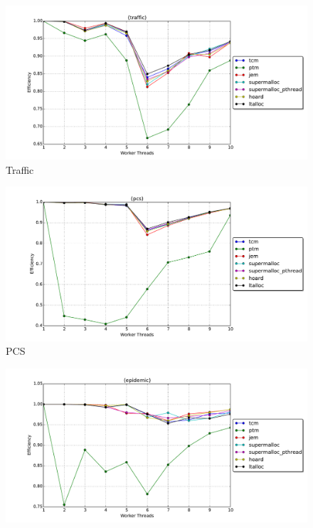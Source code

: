 \documentclass[11pt]{book}
\begin{document}
\begin{figure}
  \begin{minipage}{.5\textwidth}
    \begin{center}
      \includegraphics[width=\textwidth,keepaspectratio,quiet]{figs/memory_allocation/traffic_efficiency.pdf} \\
      Traffic \\
    \end{center}
  \end{minipage}%
  \hfill
  \begin{minipage}{.5\textwidth}
    \begin{center}
      \includegraphics[width=\textwidth,keepaspectratio,quiet]{figs/memory_allocation/pcs_efficiency.pdf} \\
      PCS \\
    \end{center}
  \end{minipage}
  \begin{minipage}{.5\textwidth}
    \begin{center}
      \includegraphics[width=\textwidth,keepaspectratio,quiet]{figs/memory_allocation/epidemic_efficiency.pdf} \\

\end{center}
\end{minipage}
\end{figure}
\end{document}
